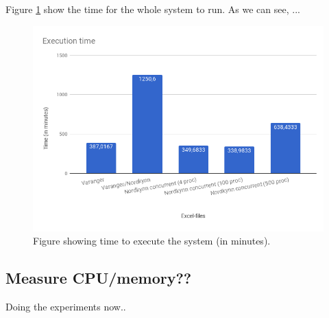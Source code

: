 \documentclass[USenglish]{uit-thesis}
\begin{document}
Figure \ref{fig:time_chart_overall} show the time for the whole system to run. As we can see, ...

\begin{figure}
\centering
\includegraphics[width=\textwidth]{chart3_new.png}
\caption{Figure showing time to execute the system (in minutes).}
\label{fig:time_chart_overall}
\end{figure}

\subsection{Measure CPU/memory??}
Doing the experiments now..
\end{document}
